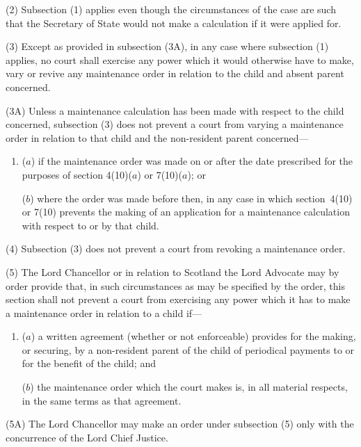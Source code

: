 \documentclass[a4paper]{article}
\begin{document}
(2)
Subsection (1) applies even though the circumstances of the case are such
that the Secretary of State would not make a calculation if it were
applied for.

(3)
Except as provided in subsection (3A), in any case where subsection (1)
applies, no court shall exercise any power which it would otherwise have to make,
vary or revive any maintenance order in relation to the child and absent parent
concerned.

(3A) Unless a maintenance calculation has been made with respect to the child
concerned, subsection (3) does not prevent a court from varying a maintenance
order in relation to that child and the non-resident parent concerned---
\begin{enumerate}\item[]
($a$)
if the maintenance order was made on or after the date prescribed for the
purposes of section 4(10)($a$) or 7(10)($a$); or

($b$)
where the order was made before then, in any case in which section~4(10)
or 7(10) prevents the making of an application for a maintenance
calculation with respect to or by that child.
\end{enumerate}

(4)
Subsection (3) does not prevent a court from revoking a maintenance order.

(5)
The Lord Chancellor or in relation to Scotland the Lord Advocate may by order
provide that, in such circumstances as may be specified by the order, this section shall
not prevent a court from exercising any power which it has to make a maintenance
order in relation to a child if---
\begin{enumerate}\item[]
($a$)
a written agreement (whether or not enforceable) provides for the
making, or securing, by a non-resident parent
of the
child of periodical payments to or for the benefit of the child; and

($b$)
the maintenance order which the court makes is, in all material respects,
in the same terms as that agreement.
\end{enumerate}


(5A)
The Lord Chancellor may make an order under subsection (5) only with the
concurrence of the Lord Chief Justice.
\end{document}
